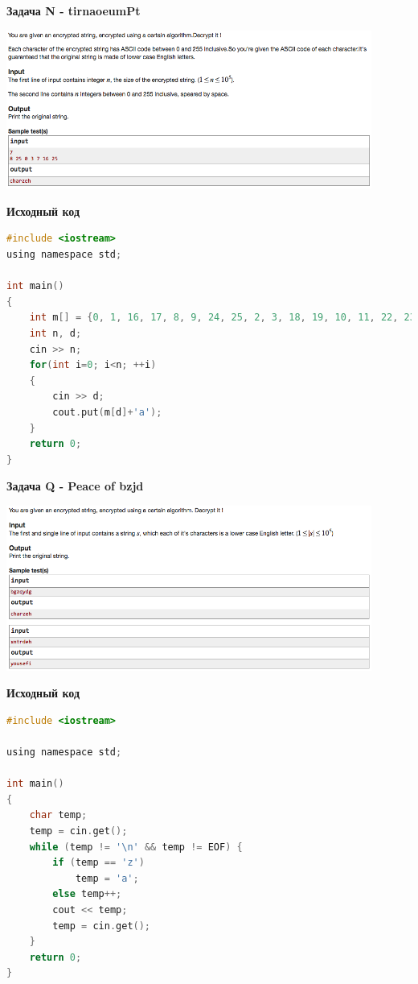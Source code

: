 \documentclass[a4paper,12pt]{article}
\begin{document}
\newpage
\textbf{{\large Задача N - tirnaoeumPt}}

\begin{center}
\includegraphics[width=0.9\textwidth]{CT_Crypto/CT_Crypto_N.png}\\ [1cm]
\end{center}

\textbf{{\large Исходный код}} \\
\begin{lstlisting}[language=C]
#include <iostream>
using namespace std;

int main()
{
    int m[] = {0, 1, 16, 17, 8, 9, 24, 25, 2, 3, 18, 19, 10, 11, 22, 23, 4,  5,  20, 21, 12, 13, 22, 23, 6,  7,  22, 23, 14, 15};
    int n, d;
    cin >> n;
    for(int i=0; i<n; ++i)
    {
        cin >> d;
        cout.put(m[d]+'a');
    }
    return 0;
}
\end{lstlisting}

\newpage
\textbf{{\large Задача Q - Peace of bzjd}}

\begin{center}
\includegraphics[width=0.9\textwidth]{CT_Crypto/CT_Crypto_Q.png}\\ [1cm]
\end{center}

\textbf{{\large Исходный код}} \\
\begin{lstlisting}[language=C]
#include <iostream>

using namespace std;

int main()
{
    char temp;
    temp = cin.get();
    while (temp != '\n' && temp != EOF) {
        if (temp == 'z')
            temp = 'a';
        else temp++;
        cout << temp;
        temp = cin.get();
    }
    return 0;
}
\end{lstlisting}
\end{document}
